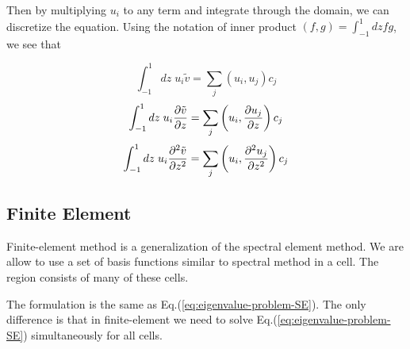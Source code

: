 Then by multiplying $u_{i}$ to any term and integrate through the domain, we can discretize the equation. Using the notation of inner product $(f,g)=\int_{-1}^{1} dz fg$, we see that

\[ \int_{-1}^{1} dz \; u_i\tilde{v} = \sum_{j}(u_i,u_j)c_j \]
\[ \int_{-1}^{1} dz \; u_i\pdv{\tilde{v}}{z} = \sum_{j}\left(u_i,\pdv{u_j}{z}\right)c_j \]
\[ \int_{-1}^{1} dz \; u_i\pdv[2]{\tilde{v}}{z} = \sum_{j}\left(u_i,\pdv[2]{u_j}{z}\right)c_j \]

\subsection{Finite Element}
Finite-element method is a generalization of the spectral element method. We are allow to use a set of basis functions similar to spectral method in a cell. The region consists of many of these cells.

The formulation is the same as Eq.(\ref{eq:eigenvalue-problem-SE}). The only difference is that in finite-element we need to solve Eq.(\ref{eq:eigenvalue-problem-SE}) simultaneously for all cells.
